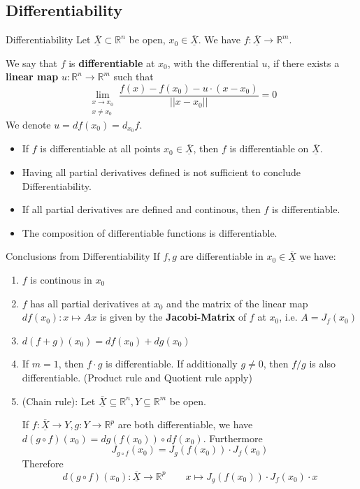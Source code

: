 \documentclass[a4paper,fontsize = 10pt]{article}
\def\R{\mathbb{R}}
\def\X{\underline{\overline{X}}}
\begin{document}
\subsection{Differentiability}
\begin{mainbox}{Differentiability}
    Let $\X \subset \R^n$ be open, $x_0 \in \X$. We have 
    $f: \X \to \R^m$. 

    We say that $f$ is \textbf{differentiable} at $x_0$, with the differential $u$, if there exists a \textbf{linear map} $u: \R^n \to \R^m$ such that 
    \[\lim_{\substack{x \to x_0 \\ x \neq x_0}} \frac{f(x)-f(x_0)-u\cdot(x-x_0)}{||x-x_0||} = 0\]
    We denote $u = df(x_0) = d_{x_0}f$.
\end{mainbox}
\begin{itemize}
    \item If $f$ is differentiable at all points $x_0 \in \X$, then $f$ is differentiable on $\X$.
    \item Having all partial derivatives defined is not sufficient to conclude Differentiability.
    \item If all partial derivatives are defined and continous, then $f$ is differentiable.
    \item The composition of differentiable functions is differentiable.
\end{itemize}
\begin{mainbox}{Conclusions from Differentiability}
    If \(f,g\) are differentiable in \(x_0 \in \X\) we have:
    \begin{enumerate}
    \item \(f\) is continous in \(x_0\)
    \item \(f\) has all partial derivatives at \(x_0\) and the matrix of the linear map \(df(x_0): x \mapsto Ax\) is given by the \textbf{Jacobi-Matrix} of \(f\) at \(x_0\), i.e. \(A = J_f(x_0)\)
    \item \(d(f+g)(x_0) = df(x_0) + dg(x_0)\)
    \item If \(m = 1\), then \(f\cdot g\) is differentiable. If additionally \(g \ne 0\), then \(f/g\) is also differentiable. (Product rule and Quotient rule apply)
    \item (Chain rule): Let $\X \subseteq \R^n, Y \subseteq \R^m$ be open. 
    
    If \(f: \X \to Y, g: Y \to \R^p\) are both differentiable, we have \(d(g \circ f)(x_0) = dg(f(x_0)) \circ df(x_0)\). 
    Furthermore \[J_{g \circ f}(x_0) = J_g(f(x_0)) \cdot J_f(x_0)\]
    Therefore \[d(g \circ f)(x_0): \X \to \R^p \qquad x \mapsto J_g(f(x_0)) \cdot J_f(x_0) \cdot x\]
    \end{enumerate}
\end{mainbox}
\end{document}
